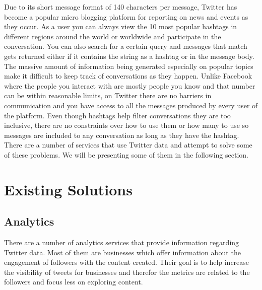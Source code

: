Due to its short message format of 140 characters per message, Twitter has become a popular micro blogging platform for reporting on news and events as they occur.
As a user you can always view the 10 most popular hashtags in different regions around the world or worldwide and participate in the conversation. You can also search for a certain query and messages that match gets returned either if it contains the string as a hashtag or in the message body.
\newline
The massive amount of information being generated especially on popular topics make it difficult to keep track of conversations as they happen. Unlike Facebook where the people you interact with are mostly people you know and that number can be within reasonable limits, on Twitter there are no barriers in communication and you have access to all the messages produced by every user of the platform. Even though hashtags help filter conversations they are too inclusive, there are no constraints over how to use them or how many to use so messages are included to any conversation as long as they have the hashtag.
\newline
There are a number of services that use Twitter data and attempt to solve some of these problems. We will be presenting some of them in the following section.

\section{Existing Solutions}
\label{sec:ES}

\subsection{Analytics}
\label{sub-sec:analytics}

There are a number of analytics services that provide information regarding Twitter data. Most of them are businesses which offer information about the engagement of followers with the content created. Their goal is to help increase the visibility of tweets for businesses and therefor the metrics are related to the followers and focus less on exploring content.


